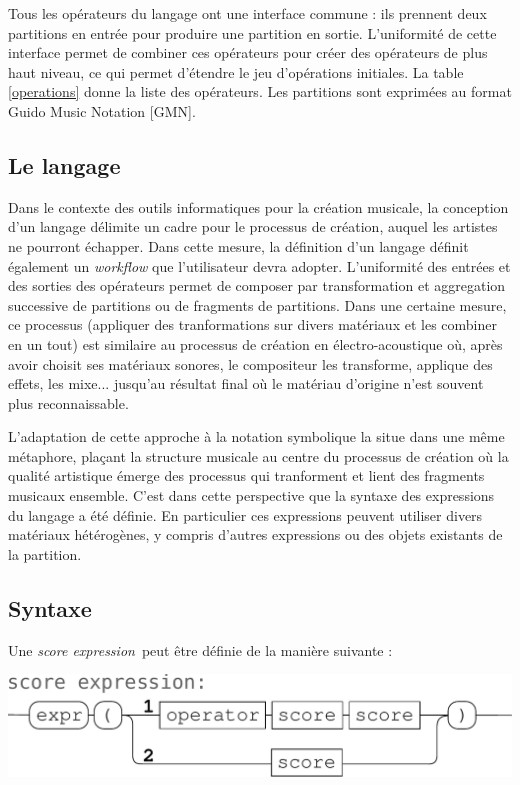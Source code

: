 \documentclass{article}
\newcommand{\sExpr}{\emph{score expression}}
\begin{document}
Tous les opérateurs du langage ont une interface commune : ils prennent deux partitions en entrée pour produire une partition en sortie. L'uniformité de cette interface permet de combiner ces opérateurs pour créer des opérateurs de plus haut niveau, ce qui permet d'étendre le jeu d'opérations initiales. La table \ref{operations} donne la liste des opérateurs.
Les partitions sont exprimées au format Guido Music Notation [GMN]\cite{hoos98}. 


\subsection{Le langage}

Dans le contexte des outils informatiques pour la création musicale, la conception d'un langage délimite un cadre pour le processus de création, auquel les artistes ne pourront échapper. Dans cette mesure, la définition d'un langage définit également un \textit{workflow} que l'utilisateur devra adopter. 
L'uniformité des entrées et des sorties des opérateurs permet de composer par transformation et aggregation successive de partitions ou de fragments de partitions. Dans une certaine mesure, ce processus (appliquer des tranformations sur divers matériaux et les combiner en un tout) est similaire au processus de création en électro-acoustique où, après avoir choisit ses matériaux sonores, le compositeur les transforme, applique des effets, les mixe... jusqu'au résultat final où le matériau d'origine n'est souvent plus reconnaissable.

L'adaptation de cette approche à la notation symbolique la situe dans une même métaphore, plaçant la structure musicale au centre du processus de création où la qualité artistique émerge des processus qui tranforment et lient des fragments musicaux ensemble.
C'est dans cette perspective que la syntaxe des expressions du langage a été définie. En particulier ces expressions peuvent utiliser divers matériaux hétérogènes, y compris d'autres expressions ou des objets existants de la partition.


\subsection{Syntaxe}
Une \sExpr\ peut être définie de la manière suivante :
\begin{center}
\includegraphics[width=0.9\columnwidth]{imgs/syntax1}
\end{center}
\end{document}
